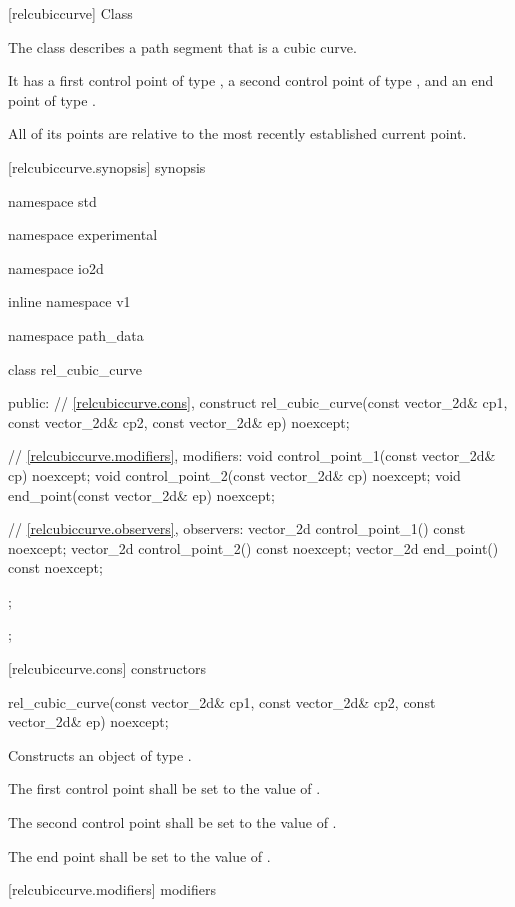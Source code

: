  [relcubiccurve] {Class }

\pnum
{}
The class  describes a path segment that is a cubic \bezierlocal curve.

\pnum
It has a first control point of type , a second control point of type , and an end point of type .

\pnum
All of its points are relative to the most recently established current point.

 [relcubiccurve.synopsis] { synopsis}

\begin{codeblock}
namespace std { namespace experimental { namespace io2d { inline namespace v1 {
  namespace path_data {
    class rel_cubic_curve {
    public:
      // \ref{relcubiccurve.cons}, construct
      rel_cubic_curve(const vector_2d& cp1, const vector_2d& cp2,
        const vector_2d& ep) noexcept;

      // \ref{relcubiccurve.modifiers}, modifiers:
      void control_point_1(const vector_2d& cp) noexcept;
      void control_point_2(const vector_2d& cp) noexcept;
      void end_point(const vector_2d& ep) noexcept;

      // \ref{relcubiccurve.observers}, observers:
      vector_2d control_point_1() const noexcept;
      vector_2d control_point_2() const noexcept;
      vector_2d end_point() const noexcept;
    };
  };
} } } }
\end{codeblock}

 [relcubiccurve.cons] { constructors}
\begin{itemdecl}
    rel_cubic_curve(const vector_2d& cp1, const vector_2d& cp2,
      const vector_2d& ep) noexcept;
\end{itemdecl}
\begin{itemdescr}
	\pnum
	\effects
	Constructs an object of type .
	
	\pnum
	The first control point shall be set to the value of .
	
	\pnum
	The second control point shall be set to the value of .
	
	\pnum
	The end point shall be set to the value of .
\end{itemdescr}

 [relcubiccurve.modifiers]{ modifiers}

